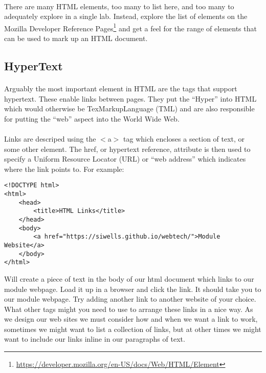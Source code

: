 \documentclass[10pt, a4paper]{article}
\begin{document}
\paragraph{} There are many HTML elements, too many to list here, and too many to adequately explore in a single lab. Instead, explore the list of elements on the Mozilla Developer Reference Pages\footnote{\url{https://developer.mozilla.org/en-US/docs/Web/HTML/Element}} and get a feel for the range of elements that can be used to mark up an HTML document.

\subsection{HyperText}
\paragraph{} Arguably the most important element in HTML are the tags that support hypertext. These enable links between pages. They put the ``Hyper'' into HTML which would otherwise be TexMarkupLanguage (TML) and are also responsible for putting the ``web'' aspect into the World Wide Web.

\paragraph{} Links are descriped using the $<$a$>$ tag which encloses a section of text, or some other element. The href, or hypertext reference, attribute is then used to specify a Uniform Resource Locator (URL) or ``web address'' which indicates where the link points to. For example:

\begin{lstlisting}
<!DOCTYPE html>
<html>
    <head>
        <title>HTML Links</title>
    </head>
    <body>
        <a href="https://siwells.github.io/webtech/">Module Website</a>        
    </body>
</html>
\end{lstlisting}
Will create a piece of text in the body of our html document which links to our module webpage. Load it up in a browser and click the link. It should take you to our module webpage. Try adding another link to another website of your choice. What other tags might you need to use to arrange these links in a nice way. As we design our web sites we must consider how and when we want a link to work, sometimes we might want to list a collection of links, but at other times we might want to include our links inline in our paragraphs of text.
\end{document}
